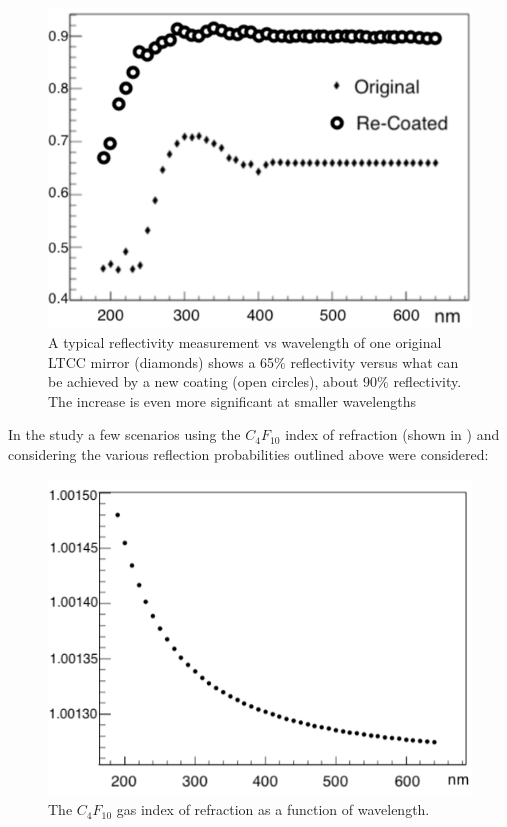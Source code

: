 \begin{figure}
	\centering
	\includegraphics[width=0.98\columnwidth, height=0.7\columnwidth]{img/reflectivityGain.png}
	\caption{A typical reflectivity measurement vs wavelength of one original LTCC mirror (diamonds)
			shows a 65\% reflectivity versus what can be achieved
			by a new coating (open circles), about 90\% reflectivity. The increase is even more significant at smaller wavelengths }
	\label{fig:reflectivityGain}
\end{figure}

In the study a few scenarios using the $C_4F_{10}$ index of refraction (shown in )
and considering the various reflection probabilities outlined above  were considered:

\begin{figure}
	\centering
	\includegraphics[width=0.98\columnwidth, height=0.65\columnwidth]{img/c4f10RefrIndex.png}
	\caption{The $C_4F_{10}$ gas index of refraction as a function of wavelength.}
	\label{fig:c4f10RefrIndex}
\end{figure}

